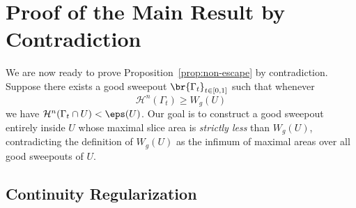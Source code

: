 \section{Proof of the Main Result by Contradiction}\label{sec:proof-by-contradiction}

We are now ready to prove Proposition~\ref{prop:non-escape} by contradiction. Suppose there exists
a good sweepout $\br{\Gamma_t}_{t \in [0, 1]}$ such that whenever
\begin{equation*}
    \mathcal{H}^n(\Gamma_t) \geq W_g(U)
\end{equation*}
we have $\mathcal{H}^n(\Gamma_t\cap U) < \eps(U)$. Our goal is to construct a good sweepout entirely
inside $U$ whose maximal slice area is \emph{strictly less} than $W_g(U)$, contradicting the
definition of $W_g(U)$ as the infimum of maximal areas over all good sweepouts of $U$.

\subsection{Continuity Regularization}

